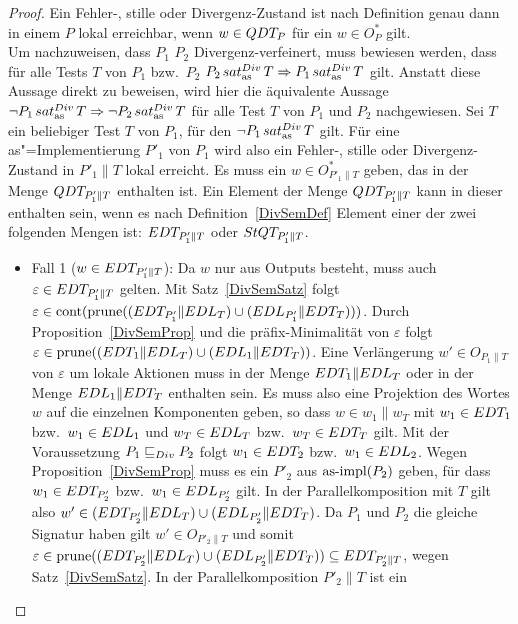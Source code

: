 \begin{proof}
  Ein Fehler-, stille oder Divergenz-Zustand ist nach Definition genau dann in
  einem \MEIO{} $P$ lokal erreichbar, wenn $w\in QDT _P$ für ein $w\in O_P^*$
  gilt.\\
  Um nachzuweisen, dass $P_1$ $P_2$ Divergenz-verfeinert, muss bewiesen werden,
  dass für alle Tests $T$ von $P_1$ bzw.\ $P_2$ $P_2\hspace{0.05cm}sat_\mathrm{as}^{Div}\hspace{0.05cm} T \Rightarrow P_1
  \hspace{0.05cm}sat_\mathrm{as}^{Div}\hspace{0.05cm} T$ gilt. Anstatt diese Aussage direkt zu beweisen, wird hier die
  äquivalente Aussage $\neg P_1\hspace{0.05cm}sat_\mathrm{as}^{Div}\hspace{0.05cm} T\Rightarrow\neg P_2\hspace{0.05cm}sat_\mathrm{as}^{Div}\hspace{0.05cm} T$ für alle
  Test $T$ von $P_1$ und $P_2$ nachgewiesen. Sei $T$ ein beliebiger Test $T$ von
  $P_1$, für den $\neg P_1\hspace{0.05cm}sat_\mathrm{as}^{Div}\hspace{0.05cm} T$ gilt. Für eine as"=Implementierung $P'_1$
  von $P_1$ wird also ein Fehler-, stille oder Divergenz-Zustand in $P'_1\|T$
  lokal erreicht. Es muss ein $w\in O_{P'_1\|T}^*$ geben, das in der Menge
  $QDT _{P'_1\|T}$ enthalten ist. Ein Element der Menge $QDT _{P'_1\|T}$ kann
  in dieser enthalten sein, wenn es nach Definition~\ref{DivSemDef} Element
  einer der zwei folgenden Mengen ist: $EDT _{P'_1\|T}$ oder $StQT _{P'_1\|T}$.
  \begin{itemize}
    \item Fall 1 ($w\in EDT _{P'_1\|T}$): Da $w$ nur aus Outputs besteht, muss
      auch $\varepsilon\in EDT _{P'_1\|T}$ gelten. Mit Satz~\ref{DivSemSatz}
      folgt $\varepsilon\in\mathrm{cont} (\mathrm{prune} ((EDT _{P'_1}\|EDL _T)\cup (EDL
      _{P'_1}\|EDT _T)))$. Durch Proposition~\ref{DivSemProp} und die
      präfix-Minimalität von $\varepsilon$ folgt $\varepsilon\in\mathrm{prune} ((EDT
      _1\|EDL _T)\cup (EDL _1\|EDT _T))$. Eine Verlängerung $w'\in
      O_{P_1\|T}$ von $\varepsilon$ um lokale Aktionen muss in der Menge $EDT
      _1\|EDL _T$ oder in der Menge $EDL _1\|EDT _T$ enthalten sein. Es muss
      also eine Projektion des Wortes $w$ auf die einzelnen Komponenten geben,
      so dass $w\in w_1\|w_T$ mit $w_1\in EDT _1$ bzw.\ $w_1\in EDL _1$ und
      $w_T\in EDL _T$ bzw.\ $w_T\in EDT _T$ gilt. Mit der Voraussetzung $P_1
       \sqsubseteq  _{Div} P_2$ folgt $w_1\in EDT _2$ bzw.\ $w_1\in EDL _2$. Wegen
      Proposition~\ref{DivSemProp} muss es ein $P'_2$ aus $\mathrm{as}\text{-}\mathrm{impl} (P_2)$ geben,
      für dass $w_1\in EDT _{P'_2}$ bzw.\ $w_1\in EDL _{P'_2}$ gilt. In der
      Parallelkomposition mit $T$ gilt also $w'\in (EDT _{P'_2}\|EDL _T)\cup
      (EDL _{P'_2}\|EDT _T)$. Da $P_1$ und $P_2$ die gleiche Signatur haben
      gilt $w'\in O _{P'_2\|T}$ und somit $\varepsilon\in\mathrm{prune} ((EDT
      _{P'_2}\|EDL _T)\cup (EDL _{P'_2}\|EDT _T))\subseteq EDT _{P'_2\|T}$,
      wegen Satz~\ref{DivSemSatz}. In der Parallelkomposition $P'_2\|T$ ist ein

\end{itemize}
\end{proof}

